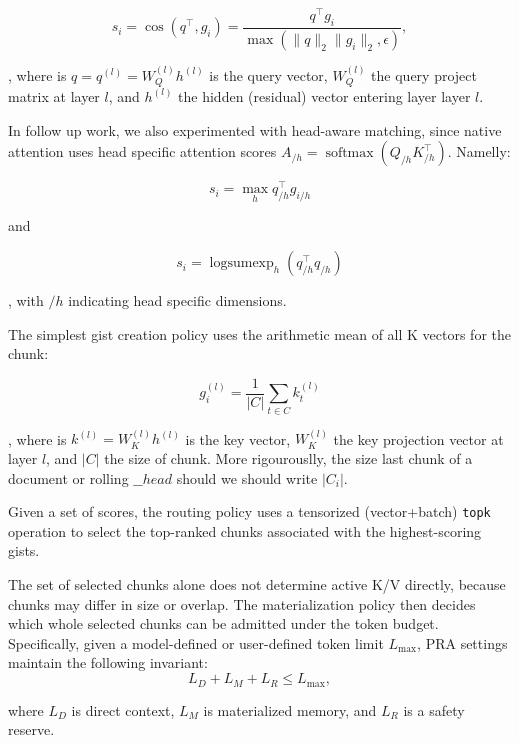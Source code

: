 \documentclass[11pt]{article}
\begin{document}
\begin{equation}
  s_i = \cos(q^\top, g_i) = \frac{q^\top g_i}{\max(\lVert q\rVert_2\lVert g_i\rVert_2,\epsilon)},
\end{equation}

\noindent, where is $q = q^{(l)} = W_Q^{(l)} h^{(l)}$ is the query vector, 
$W_Q^{(l)}$ the query project matrix at layer $l$, 
and $h^{(l)}$ the hidden (residual) vector entering layer layer $l$.

In follow up work, we also experimented with head-aware matching, 
since native attention uses head specific attention scores $A_{/h}=\operatorname{softmax}(Q_{/h} K_{/h}^\top)$.
Namelly:

\[ 
s_i=\max_h q_{/h}^\top g_{i/h}
\]

and

\[
s_i= \operatorname{logsumexp}_h \left(q_{/h}^\top q_{/h}\right)
\]

\noindent, with $/h$ indicating head specific dimensions.


The simplest gist creation policy uses the arithmetic mean of all K vectors for the chunk:

\begin{equation}
g_i^{(l)} = \frac{1}{|C|} \sum_{t\in C} k_t^{(l)}
\end{equation}

\noindent, where is $k^{(l)} = W_K^{(l)} h^{(l)}$ is the key vector, $W_K^{(l)}$ the key projection vector
at layer $l$, and $|C|$ the size of chunk. More rigourouslly, the size last chunk of a document or rolling $\_\_head$
should we should write $|C_i|$.



Given a set of scores, the routing policy uses a tensorized  (vector+batch) \texttt{topk} operation to select the
top-ranked chunks associated with the highest-scoring gists.


The set of selected chunks alone does not determine active K/V directly,
because chunks may differ in size or overlap. 
The materialization policy then decides which whole selected chunks can be admitted under
the token budget. Specifically, given a model-defined or user-defined token limit $L_{\max}$,
PRA settings maintain the following invariant:
\begin{equation}
  L_D + L_M + L_R \leq L_{\max},
  \label{eq:budget}
\end{equation}

\noindent where $L_D$ is direct context, $L_M$ is materialized memory, and $L_R$ is a safety reserve.
\end{document}
